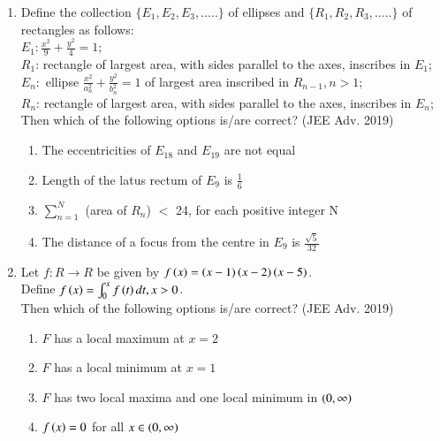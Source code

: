\documentclass[journal]{IEEEtran}
\begin{document}
\begin{enumerate}
{        }
    \item{
        
            Define the collection $\{E_1, E_2, E_3, .....\}$ of ellipses and $\{R_1, R_2, R_3, .....\}$ of rectangles as follows:\\[6pt]
            $E_1 : \frac{x^2}{9}+ \frac{y^2}{4} = 1$;\\[6pt]
            $R_1$: rectangle of largest area, with sides parallel to the axes, inscribes in $E_1$;\\[6pt]
            $E_n : $ ellipse $\frac{x^2}{a_n^2}+ \frac{y^2}{b_n^2} = 1$ of largest area inscribed in $R_{n-1}, n>1;$\\[6pt]
            $R_n$: rectangle of largest area, with sides parallel to the axes, inscribes in $E_n$;\\ Then which of the following options is/are correct?
             \hfill
                {(JEE Adv. 2019)}
            
            \begin{enumerate}
                \item The eccentricities of $E_{18}$ and $E_{19}$ are not equal
                \item Length of the latus rectum of $E_{9}$ is $\frac{1}{6}$
                \item $\sum_{n=1}^N$ (area of $R_n$) $<$ 24, for each positive integer N
                \item The distance of a focus from the centre in $E_9$ is $\frac{\sqrt{5}}{32}$
            \end{enumerate}
        
        }
    \item{
        
            Let $f: R\rightarrow R$ be given by $f\left(x\right) = \left(x-1\right)\left(x-2\right)\left(x-5\right)$.\\[6pt] 
            Define $f\left(x\right) = \int_0^x f\left(t\right)dt, x>0$.\\[3pt]
            Then which of the following options is/are correct?
             \hfill
                {(JEE Adv. 2019)}
            
            \begin{enumerate}
                \item $F$ has a local maximum at $x=2$
                \item $F$ has a local minimum at $x=1$
                \item $F$ has two local maxima and one local minimum in $\left(0,\infty\right)$
                \item $f\left(x\right) = 0$ for all $x \in \left(0,\infty\right)$
            \end{enumerate}
        
}
\end{enumerate}
\end{document}
